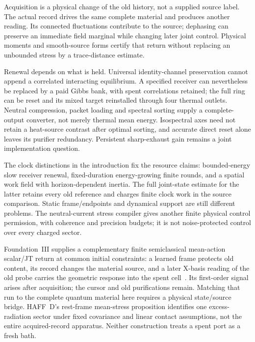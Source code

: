 Acquisition is a physical change of the old history, not a supplied source label. The actual record drives the same complete material and produces another reading. Its connected fluctuations contribute to the source; dephasing can preserve an immediate field marginal while changing later joint control. Physical moments and smooth-source forms certify that return without replacing an unbounded stress by a trace-distance estimate.

Renewal depends on what is held. Universal identity-channel preservation cannot append a correlated interacting equilibrium. A specified receiver can nevertheless be replaced by a paid Gibbs bank, with spent correlations retained; the full ring can be reset and its mixed target reinstalled through four thermal outlets. Neutral compression, packet loading and spectral sorting supply a complete-output converter, not merely thermal mean energy. Isospectral axes need not retain a heat-source contrast after optimal sorting, and accurate direct reset alone leaves its purifier redundancy. Persistent sharp-exhaust gain remains a joint implementation question.

The clock distinctions in the introduction fix the resource claims: bounded-energy slow receiver renewal, fixed-duration energy-growing finite rounds, and a spatial work field with horizon-dependent inertia. The full joint-state estimate for the latter retains every old reference and charges finite clock work in the source comparison. Static frame/endpoints and dynamical support are still different problems. The neutral-current stress compiler gives another finite physical control permission, with coherence and precision budgets; it is not noise-protected control over every charged sector.

Foundation~III supplies a complementary finite semiclassical mean-action scalar/JT return at common initial constraints: a learned frame protects old content, its record changes the material source, and a later X-basis reading of the old probe carries the geometric response into the spent cell~\cite{FoundationIII}. Its first-order signal arises after acquisition; the cursor and old purifications remain. Matching that run to the complete quantum material here requires a physical state/source bridge. HAFF~D's rest-frame mean-stress proposition identifies one excess-radiation sector under fixed covariance and linear contact assumptions, not the entire acquired-record apparatus. Neither construction treats a spent port as a fresh bath.


